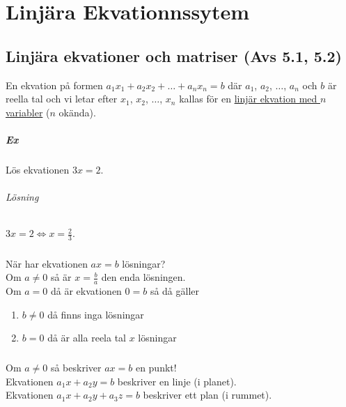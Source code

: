 \chapter{Linjära Ekvationnssytem}
\section{Linjära ekvationer och matriser (Avs 5.1, 5.2)}
En ekvation på formen $a_{1}x_{1}+a_{2}x_{2}+\ldots+a_{n}x_{n}=b$ där $a_{1}$, $a_{2}$, $\ldots$, $a_{n}$ och 
$b$ är reella tal och vi letar efter $x_{1}$, $x_{2}$, $\ldots$, $x_{n}$ kallas för en
\underline{linjär ekvation med $n$ variabler} ($n$ okända).

\paragraph{Ex} Lös ekvationen $3x=2$.
\subparagraph{Lösning} $3x=2 \Leftrightarrow x=\frac{2}{3}$.

\paragraph{} När har ekvationen $ax=b$ lösningar?\\
Om $a\neq 0$ så är $x=\frac{b}{a}$ den enda lösningen.\\
Om $a=0$ då är ekvationen $0=b$ så då gäller 
\begin{enumerate}
    \item[] $b\neq 0$ då finns inga lösningar
    \item[] $b=0$ då är alla reela tal $x$ lösningar 
\end{enumerate}

\paragraph{} Om $a\neq 0$ så beskriver $ax=b$ en punkt!\\
Ekvationen $a_{1}x+a_{2}y=b$ beskriver en linje (i planet).\\
Ekvationen $a_{1}x+a_{2}y+a_{3}z=b$ beskriver ett plan (i rummet).
\clearpage 
